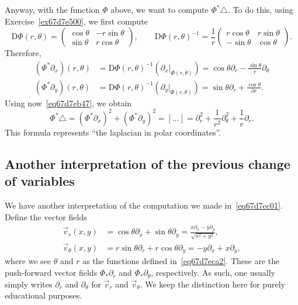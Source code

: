 \documentclass[a4paper,9pt]{amsart}
\newcommand{\de}{\partial}		%
\newcommand{\Diff}{\mathrm{D}}
\newcommand{\laplacian}{\triangle}
\theoremstyle{plain}
\theoremstyle{definition}
\theoremstyle{remark}
\begin{document}
Anyway, with the function $\Phi$ above, we want to compute $\Phi^*\laplacian$.
To do this, using Exercise~\ref{ex67d7e500}, we first compute
\begin{equation}
	\Diff\Phi(r,\theta) 
	= \begin{pmatrix} \cos\theta & - r\sin\theta \\ \sin\theta & r\cos\theta \end{pmatrix} ,
	\qquad
	\Diff\Phi(r,\theta)^{-1}
	= \frac1r \begin{pmatrix} r \cos\theta & r\sin\theta \\ - \sin\theta & \cos\theta\end{pmatrix} .
\end{equation}
Therefore,
\begin{align*}
 	(\Phi^*\de_x)(r,\theta) 
	&= \Diff\Phi(r,\theta)^{-1} \left(\de_x|_{\Phi(r,\theta)}\right)
	= \cos\theta \de_r - \frac{\sin\theta}{r} \de_\theta \\
	(\Phi^*\de_y)(r,\theta)
	&= \Diff\Phi(r,\theta)^{-1} \left(\de_y|_{\Phi(r,\theta)}\right)
	= \sin\theta\de_r + \frac{\cos\theta}{\de r} .
\end{align*}
Using now~\eqref{eq67d7eb47}, we obtain
\begin{equation}\label{eq67d7ec01}
	\Phi^*\laplacian  
	= (\Phi^*\de_x)^2 + (\Phi^*\de_y)^2
	= [...]
	= \de_r^2 + \frac{1}{r^2} \de_\theta^2 + \frac1r \de_r .
\end{equation}
This formula represents ``the laplacian in polar coordinates''.

\subsection{Another interpretation of the previous change of variables}
We have another interpretation of the computation we made in~\eqref{eq67d7ec01}.
Define the vector fields
\begin{align*}
	\vec v_r(x,y) &= \cos\theta \de_x + \sin\theta\de_ y 
		= \frac{x\de_x-y\de_y}{\sqrt{x^2+y^2}} , \\
	\vec v_\theta(x,y) &= r\sin\theta \de_r + r\cos\theta \de_y 
		= -y\de_x + x\de_y ,
\end{align*}
where we see $\theta$ and $r$ as the functions defined in~\eqref{eq67d7eca2}.
These are the push-forward vector fields $\Phi_*\de_r$ and $\Phi_*\de_\theta$, respectively.
As such, one usually simply writes $\de_r$ and $\de_\theta$ for $\vec v_r$ and $\vec v_\theta$.
We keep the distinction here for purely educational purposes.
\end{document}
